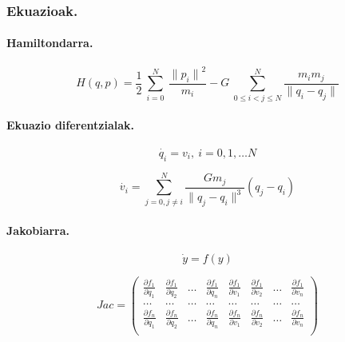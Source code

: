 \subsubsection{Ekuazioak.}

\paragraph*{Hamiltondarra.}

\begin{equation}
H(q,p)=\frac{1}{2}\ \sum^N_{i=0}{\ \frac{{\|p_i\|}^2}{m_i}}-G\ \sum^N_{0\le i<j\le N}{\frac{m_im_j}{\|q_i-q_j\|}} 
\end{equation}


\paragraph*{Ekuazio diferentzialak.}

\begin{equation}
\dot{q_i}=v_i, \  i=0,1,\dots N
\end{equation}

\begin{equation}
\dot{v_i}= \sum_{j=0,j \neq i}^{N} \frac{Gm_j}{\|q_j-q_i\|^3} (q_j-q_i)
\end{equation}

\paragraph{Jakobiarra.}

\begin{equation*}
\dot{y}=f(y)
\end{equation*}

\begin{equation}
Jac=\left(\begin{array}{cccccccc}
    \frac{\partial f_1}{\partial q_1} & \frac{\partial f_1}{\partial q_2} & \dots & \frac{\partial f_1}{\partial q_n} &
    \frac{\partial f_1}{\partial v_1} & \frac{\partial f_1}{\partial v_2} & \dots & \frac{\partial f_1}{\partial v_n}\\
    
    \dots & \dots & \dots & \dots & \dots & \dots & \dots & \dots \\
    
    \frac{\partial f_n}{\partial q_1} & \frac{\partial f_n}{\partial q_2} & \dots & \frac{\partial f_n}{\partial q_n} &
    \frac{\partial f_n}{\partial v_1} & \frac{\partial f_n}{\partial v_2} & \dots & \frac{\partial f_n}{\partial v_n}\\
  \end{array}\right)
\end{equation}

